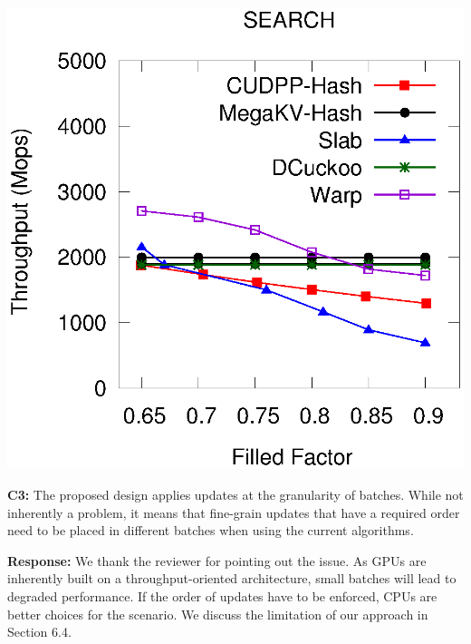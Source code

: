 \begin{minipage}{\textwidth}
\begin{minipage}[b]{0.49\textwidth}
\begin{minipage}{0.49\textwidth}
			\centerline{}
		\end{minipage}
		\begin{minipage}{0.49\textwidth}\centering
			\includegraphics[width=\textwidth]{../pic/static-load_factor/tpch/search.eps}
			\centerline{}
		\end{minipage}
	\end{minipage}
\end{minipage}

\begin{shaded}
	\noindent\textbf{C3:} The proposed design applies updates at the granularity of batches.  While not inherently a problem, it means that fine-grain updates that have a required order need to be placed in different batches when using the current algorithms.
\end{shaded}
%
\noindent\textbf{Response:} 
We thank the reviewer for pointing out the issue. As GPUs are inherently built on a throughput-oriented architecture, small batches will lead to degraded performance. 
If the order of updates have to be enforced, CPUs are better choices for the scenario. 
We discuss the limitation of our approach in Section 6.4.

